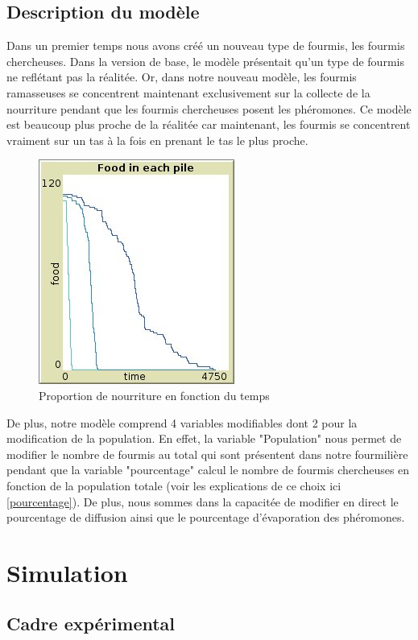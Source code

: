 \documentclass{article}
\begin{document}
\subsection{Description du modèle}
Dans un premier temps nous avons créé un nouveau type de fourmis, les fourmis chercheuses. Dans la version de base, le modèle présentait qu'un type de fourmis ne reflétant pas la réalitée. Or, dans notre nouveau modèle, les fourmis ramasseuses se concentrent maintenant exclusivement sur la collecte de la nourriture pendant que les fourmis chercheuses posent les phéromones. Ce modèle est beaucoup plus proche de la réalitée car maintenant, les fourmis se concentrent vraiment sur un tas à la fois en prenant le tas le plus proche.
\begin{figure}[h]
\centering
\includegraphics[scale=0.6]{contenu/2antstype.jpg} 
\caption{Proportion de nourriture en fonction du temps}
\label{fig:Tas}
\end{figure}
De plus, notre modèle comprend 4 variables modifiables dont 2 pour la modification de la population. En effet, la variable "Population" nous permet de modifier le nombre de fourmis au total qui sont présentent dans notre fourmilière pendant que la variable "pourcentage" calcul le nombre de fourmis chercheuses en fonction de la population totale (voir les explications de ce choix ici \ref{pourcentage}). De plus, nous sommes dans la capacitée de modifier en direct le pourcentage de diffusion ainsi que le pourcentage d'évaporation des phéromones.
\section{Simulation}
\subsection{Cadre expérimental}
\end{document}
